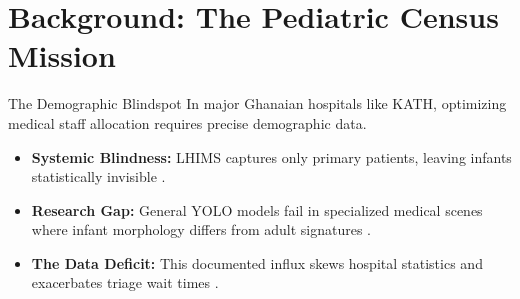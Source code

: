 \section{Background: The Pediatric Census Mission}

\begin{frame}{The Demographic Blindspot}
    In major Ghanaian hospitals like KATH, optimizing medical staff allocation requires precise demographic data.
    \begin{itemize}
        \item \textbf{Systemic Blindness:} LHIMS captures only primary patients, leaving infants statistically invisible \parencite{addotey2023}.
        \item \textbf{Research Gap:} General YOLO models fail in specialized medical scenes where infant morphology differs from adult signatures \parencite{diop2025}.
        \item \textbf{The Data Deficit:} This documented influx skews hospital statistics and exacerbates triage wait times \parencite{osei2024}.
    \end{itemize}
\end{frame}

